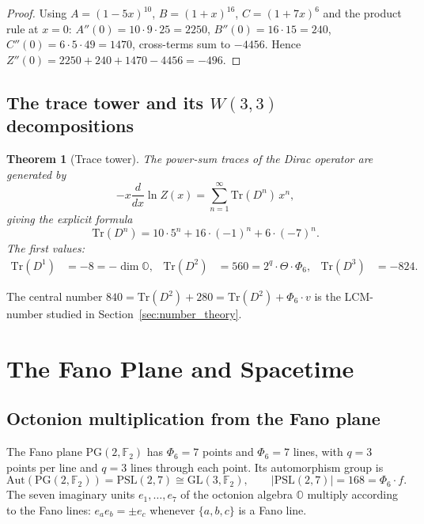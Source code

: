 \documentclass[12pt,a4paper]{article}
\newtheorem{theorem}{Theorem}[section]
\theoremstyle{definition}
\newcommand{\PG}{\mathrm{PG}}
\newcommand{\Aut}{\mathrm{Aut}}
\renewcommand{\Tr}{\mathrm{Tr}}
\newcommand{\Phisix}{\Phi_6}
\newcommand{\FF}{\mathbb{F}}
\newcommand{\OO}{\mathbb{O}}
\newcommand{\PSL}{\mathrm{PSL}}
\newcommand{\GL}{\mathrm{GL}}
\begin{document}
\begin{proof}
Using $A=(1-5x)^{10}$, $B=(1+x)^{16}$, $C=(1+7x)^6$ and the product rule at $x=0$:
$A''(0)=10\cdot 9\cdot 25=2250$, $B''(0)=16\cdot 15=240$,
$C''(0)=6\cdot 5\cdot 49=1470$, cross-terms sum to $-4456$.
Hence $Z''(0) = 2250+240+1470-4456 = -496$.
\end{proof}

\subsection{The trace tower and its \texorpdfstring{$W(3,3)$}{W(3,3)} decompositions}

\begin{theorem}[Trace tower]
\label{thm:trace_tower}
The power-sum traces of the Dirac operator are generated by
\begin{equation}
  -x\frac{d}{dx}\ln Z(x) = \sum_{n=1}^\infty \Tr(D^n)\,x^n,
\end{equation}
giving the explicit formula
\begin{equation}
  \label{eq:trace_formula}
  \Tr(D^n) = 10\cdot 5^n + 16\cdot(-1)^n + 6\cdot(-7)^n.
\end{equation}
The first values:
\begin{align}
  \Tr(D^1) &= -8 = -\dim\OO, &
  \Tr(D^2) &= 560 = 2^q\cdot\Theta\cdot\Phisix, &
  \Tr(D^3) &= -824.
\end{align}
\end{theorem}

\noindent
The central number $840 = \Tr(D^2)+280 = \Tr(D^2)+\Phisix\cdot v$
is the LCM-number studied in Section~\ref{sec:number_theory}.


\section{The Fano Plane and Spacetime}
\label{sec:fano}

\subsection{Octonion multiplication from the Fano plane}

The Fano plane $\PG(2,\FF_2)$ has $\Phisix=7$ points and $\Phisix=7$
lines, with $q=3$ points per line and $q=3$ lines through each point.
Its automorphism group is
\begin{equation}
  \Aut(\PG(2,\FF_2)) = \PSL(2,7)\cong\GL(3,\FF_2),
  \qquad|\PSL(2,7)| = 168 = \Phisix\cdot f.
\end{equation}
The seven imaginary units $e_1,\ldots,e_7$ of the octonion algebra $\OO$
multiply according to the Fano lines: $e_ae_b=\pm e_c$ whenever
$\{a,b,c\}$ is a Fano line.
\end{document}
